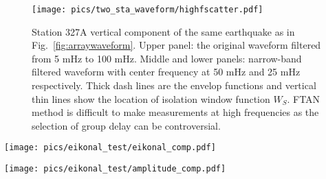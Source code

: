 \documentclass[referee]{gji}
\begin{document}
\begin{figure}
	\texttt{[image: pics/two\_sta\_waveform/highfscatter.pdf]}
	\caption{Station 327A vertical component of the same earthquake as in Fig.~\ref{fig:arraywaveform}. Upper panel: the original waveform filtered from 5 mHz to 100 mHz. Middle and lower panels: narrow-band filtered waveform with center frequency at 50 mHz and 25 mHz respectively. Thick dash lines are the envelop functions and vertical thin lines show the location of isolation window function $W_S$. FTAN method is difficult to make measurements at high frequencies as the selection of group delay can be controversial.}
	\label{fig:highfscatter}
\end{figure}

\begin{figure*}
	\texttt{[image: pics/eikonal\_test/eikonal\_comp.pdf]}
	\caption{60s Rayleigh wave Eikonal tomography results using different phase measurement methods and Eikonal tomography inversions for the April 7, 2009 earthquake near Kuril Islands ($M_s$=6.8). We select the same earthquake as shown in fig. 3a of Lin and Ritzwoller (2011) for comparison. a) Phase velocity obtained by using the FTAN phase measurement, and taking travel-time surface gradient. b) Same as a) but using cross-correlation phase measurement. c) Same as b) but phase velocity is obtained by inversing slowness vector.}
	\label{fig:eikonal_comp}
\end{figure*}

\begin{figure*}
	\texttt{[image: pics/eikonal\_test/amplitude\_comp.pdf]}
	\caption{Demostration of the amplitude correction process on the apparent phase velocity map in Fig.~\ref{fig:eikonal_comp}c. \textbf{a)} The amplitude map generated by fitting minimum curvature surface. \textbf{b)} The preliminary correction term derived from a). \textbf{c)} The smoothed correction term. \textbf{d)} The corrected phase velocity map, derived from c) and Fig.~\ref{fig:eikonal_comp}c. }
	\label{fig:amp_comp}
\end{figure*}




\label{lastpage}
\end{document}
